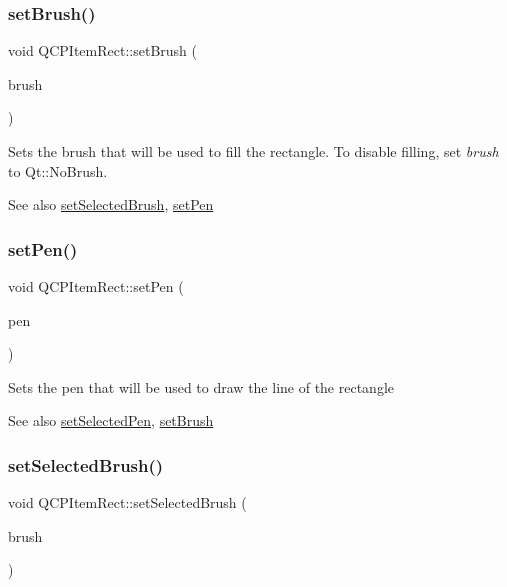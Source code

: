 \subsubsection{\texorpdfstring{set\+Brush()}{setBrush()}}
{\footnotesize\ttfamily void Q\+C\+P\+Item\+Rect\+::set\+Brush (\begin{DoxyParamCaption}\item[{const Q\+Brush \&}]{brush }\end{DoxyParamCaption})}

Sets the brush that will be used to fill the rectangle. To disable filling, set {\itshape brush} to Qt\+::\+No\+Brush.

\begin{DoxySeeAlso}{See also}
\mbox{\hyperlink{class_q_c_p_item_rect_abd1792859844118dedee86223cede7af}{set\+Selected\+Brush}}, \mbox{\hyperlink{class_q_c_p_item_rect_a483c0da5a17e1646cd17ddea2c124e7d}{set\+Pen}} 
\end{DoxySeeAlso}
\mbox{\label{class_q_c_p_item_rect_a483c0da5a17e1646cd17ddea2c124e7d}} 
\subsubsection{\texorpdfstring{set\+Pen()}{setPen()}}
{\footnotesize\ttfamily void Q\+C\+P\+Item\+Rect\+::set\+Pen (\begin{DoxyParamCaption}\item[{const Q\+Pen \&}]{pen }\end{DoxyParamCaption})}

Sets the pen that will be used to draw the line of the rectangle

\begin{DoxySeeAlso}{See also}
\mbox{\hyperlink{class_q_c_p_item_rect_a52a1bcb2dc753a538e406a2ba3cf21ce}{set\+Selected\+Pen}}, \mbox{\hyperlink{class_q_c_p_item_rect_abbd4e346a03513ee466afc25d9c75446}{set\+Brush}} 
\end{DoxySeeAlso}
\mbox{\label{class_q_c_p_item_rect_abd1792859844118dedee86223cede7af}} 
\subsubsection{\texorpdfstring{set\+Selected\+Brush()}{setSelectedBrush()}}
{\footnotesize\ttfamily void Q\+C\+P\+Item\+Rect\+::set\+Selected\+Brush (\begin{DoxyParamCaption}\item[{const Q\+Brush \&}]{brush }\end{DoxyParamCaption})}

